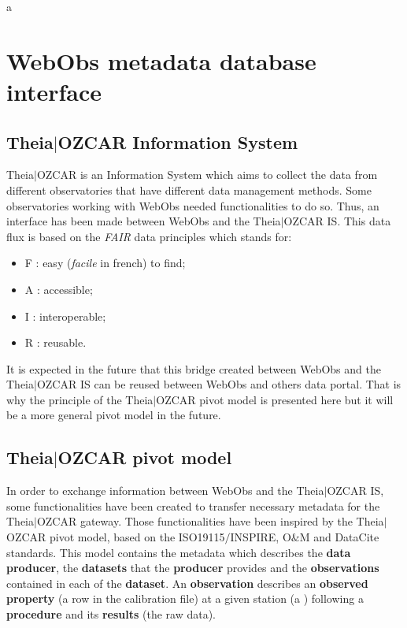 
a\chapter{WebObs metadata database interface} \label{metadata}



\section{Theia$\vert$OZCAR Information System} \label{theia}

Theia$\vert$OZCAR is an Information System which aims to collect the data from different observatories that have different data management methods. Some observatories working with WebObs needed functionalities to do so. Thus, an interface has been made between WebObs and the Theia$\vert$OZCAR IS. This data flux is based on the \textit{FAIR} data principles which stands for:

\begin{itemize}
\item 	 F : easy (\textit{facile} in french) to find;
\item 	 A : accessible;
\item 	 I : interoperable;
\item 	 R : reusable.
\end{itemize}

It is expected in the future that this bridge created between WebObs and the Theia$\vert$OZCAR IS can be reused between WebObs and others data portal. That is why the principle of the Theia$\vert$OZCAR pivot model is presented here but it will be a more general pivot model in the future.

\section{Theia$\vert$OZCAR pivot model}

In order to exchange information between WebObs and the Theia$\vert$OZCAR IS, some functionalities have been created to transfer necessary metadata for the Theia$\vert$OZCAR gateway. Those functionalities have been inspired by the Theia$\vert$OZCAR pivot model, based on the ISO19115$/$INSPIRE, O$\&$M and DataCite standards. This model contains the metadata which describes the \textbf{data producer}, the \textbf{datasets} that the \textbf{producer} provides and the \textbf{observations} contained in each of the \textbf{dataset}. An \textbf{observation} describes an \textbf{observed property} (a row in the calibration file) at a given {station} (a ) following a \textbf{procedure} and its \textbf{results} (the raw data). 

